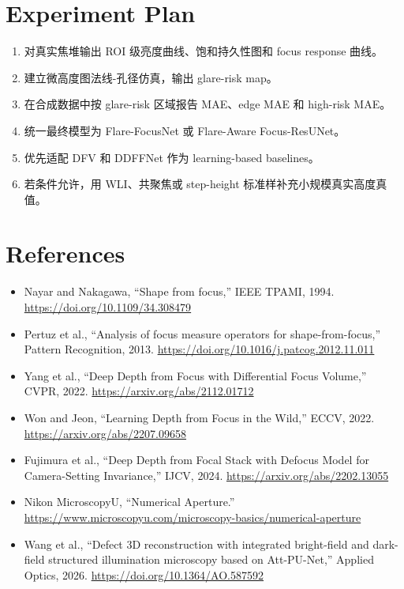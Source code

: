 \documentclass[11pt,a4paper]{ctexart}
\begin{document}
\section{Experiment Plan}

\begin{enumerate}[leftmargin=2em]
  \item 对真实焦堆输出 ROI 级亮度曲线、饱和持久性图和 focus response 曲线。
  \item 建立微高度图法线-孔径仿真，输出 glare-risk map。
  \item 在合成数据中按 glare-risk 区域报告 MAE、edge MAE 和 high-risk MAE。
  \item 统一最终模型为 Flare-FocusNet 或 Flare-Aware Focus-ResUNet。
  \item 优先适配 DFV 和 DDFFNet 作为 learning-based baselines。
  \item 若条件允许，用 WLI、共聚焦或 step-height 标准样补充小规模真实高度真值。
\end{enumerate}

\section{References}

\begin{itemize}[leftmargin=2em]
  \item Nayar and Nakagawa, ``Shape from focus,'' IEEE TPAMI, 1994. \url{https://doi.org/10.1109/34.308479}
  \item Pertuz et al., ``Analysis of focus measure operators for shape-from-focus,'' Pattern Recognition, 2013. \url{https://doi.org/10.1016/j.patcog.2012.11.011}
  \item Yang et al., ``Deep Depth from Focus with Differential Focus Volume,'' CVPR, 2022. \url{https://arxiv.org/abs/2112.01712}
  \item Won and Jeon, ``Learning Depth from Focus in the Wild,'' ECCV, 2022. \url{https://arxiv.org/abs/2207.09658}
  \item Fujimura et al., ``Deep Depth from Focal Stack with Defocus Model for Camera-Setting Invariance,'' IJCV, 2024. \url{https://arxiv.org/abs/2202.13055}
  \item Nikon MicroscopyU, ``Numerical Aperture.'' \url{https://www.microscopyu.com/microscopy-basics/numerical-aperture}
  \item Wang et al., ``Defect 3D reconstruction with integrated bright-field and dark-field structured illumination microscopy based on Att-PU-Net,'' Applied Optics, 2026. \url{https://doi.org/10.1364/AO.587592}
\end{itemize}
\end{document}
